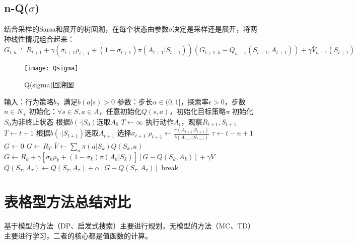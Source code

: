 \documentclass[
12pt, %
a4paper, 
oneside, %
headinclude,footinclude, %
]{scrartcl}
\begin{document}
\subsection{n-Q($ \sigma $)}
结合采样的Sarsa和展开的树回溯，在每个状态由参数$ \sigma $决定是采样还是展开，将两种线性情况组合起来：
$$ G_{t:h} \doteq R_{t + 1} + \gamma (\sigma_{t + 1} \rho_{t + 1} + (1 - \sigma_{t + 1}) \pi(A_{t + 1}|S_{t + 1}))(G_{t + 1:h} - Q_{h - 1}(S_{t + 1}, A_{t + 1})) + \gamma \bar{V}_{h - 1}(S_{t + 1}) $$

\begin{figure}[H]
\centering
\texttt{[image: Qsigma]}
\caption[Q(sigma)回溯图]{Q(sigma)回溯图}
\end{figure}
\begin{myalgorithm}
\State 输入：行为策略$ b $，满足$ b(a|s) > 0 $
\State 参数：步长$ \alpha \in (0,1] $，探索率$ \epsilon > 0 $，步数$ n \in N_+ $
\State 初始化：$ \forall s \in S, a \in A $，任意初始化$ Q(s, a) $，初始化目标策略$ \pi $
\State 初始化$ S_0 $为非终止状态
\State 根据$ b(\cdot|S_0) $选取$ A_0 $
\State $ T \gets \infty $
\State 执行动作$ A_t $，观察$ R_{t + 1},S_{t + 1} $
\State $ T \gets t + 1 $
\Else
\State 根据$ b(\cdot|S_{t + 1}) $选取$ A_{t + 1} $
\State 选择$ \sigma_{t + 1} $ 
\State $ \rho_{t + 1} \gets \frac{\pi(A_{t + 1}|S_{t + 1})}{b(A_{t + 1}|S_{t + 1})}$ 
\EndIf
\EndIf
\State $ \tau \gets t - n + 1 $ 
\State $ G \gets 0 $
\State $ G \gets R_T $
\Else
\State $ \bar{V} \gets \sum_a \pi(a|S_k)Q(S_k, a) $ 
\State $ G \gets R_k + \gamma[\sigma_k \rho_k + (1 - \sigma_k)\pi(A_k|S_k)][G - Q(S_k,A_k)] + \gamma\bar{V} $
\EndIf
\EndFor
\State $ Q(S_{\tau},A_{\tau}) \gets Q(S_{\tau},A_{\tau}) + \alpha[G - Q(S_{\tau},A_{\tau})] $
\EndIf
{}
\State break
\EndIf
\EndFor
\EndFor
\end{myalgorithm}
\section{表格型方法总结对比}
基于模型的方法（DP、启发式搜索）主要进行规划，无模型的方法（MC、TD）主要进行学习，二者的核心都是值函数的计算。
\end{document}

